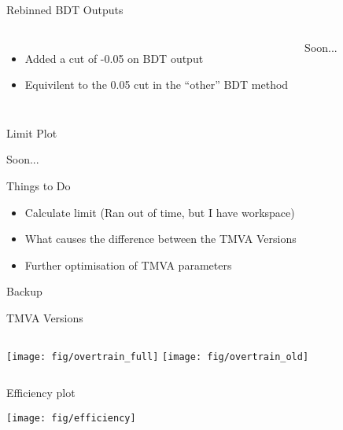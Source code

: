 \documentclass[t, 8pt]{beamer}
\begin{document}
\begin{frame}{Rebinned BDT Outputs}
  \begin{columns}[c]
  \begin{itemize}
    \item Added a cut of -0.05 on BDT output
    \item Equivilent to the 0.05 cut in the ``other'' BDT method
  \end{itemize}
    Soon...
  \end{columns}
\end{frame}

\begin{frame}{Limit Plot}
\begin{center}
Soon...
\end{center}
\end{frame}

\begin{frame}{Things to Do}
  \begin{itemize}  
  \item Calculate limit (Ran out of time, but I have workspace)
  \item What causes the difference between the TMVA Versions
  \item Further optimisation of TMVA parameters
  \end{itemize}
\end{frame}

\begin{frame}{Backup}
\end{frame}

\begin{frame}{TMVA Versions}
  \begin{columns}[c]
    \texttt{[image: fig/overtrain\_full]}
    \texttt{[image: fig/overtrain\_old]}
  \end{columns}
\end{frame}

\begin{frame}{Efficiency plot}
\begin{center}
    \texttt{[image: fig/efficiency]}
\end{center}
\end{frame}
\end{document}
